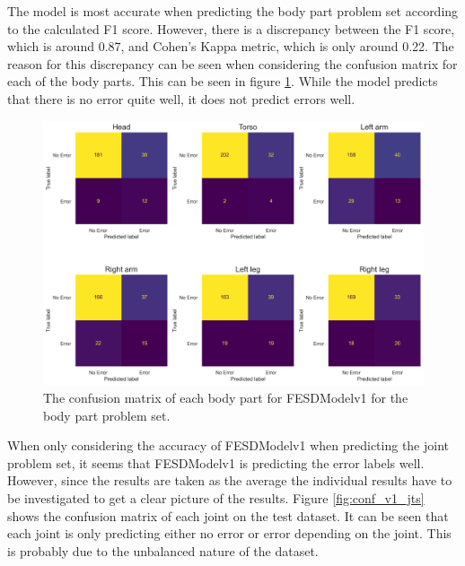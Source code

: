 The model is most accurate when predicting the body part problem set according to the calculated F1 score. However, there is a discrepancy between the F1 score, which is around 0.87, and Cohen's Kappa metric, which is only around 0.22. The reason for this discrepancy can be seen when considering the confusion matrix for each of the body parts. This can be seen in figure \ref{fig:conf_v1_bps}. While the model predicts that there is no error quite well, it does not predict errors well.

\begin{figure}[!htbp]
  \centering
  \includegraphics[width=.8\linewidth]{figures/Results/v1/confusion/body_parts_part.png}
  \caption[Confusion matrix of FESDModelv1 for each Body Part]{The confusion matrix of each body part for FESDModelv1 for the body part problem set.}
  \label{fig:conf_v1_bps}
\end{figure}

When only considering the accuracy of FESDModelv1 when predicting the joint problem set, it seems that FESDModelv1 is predicting the error labels well. However, since the results are taken as the average the individual results have to be investigated to get a clear picture of the results. Figure \ref{fig:conf_v1_jts} shows the confusion matrix of each joint on the test dataset. It can be seen that each joint is only predicting either no error or error depending on the joint. This is probably due to the unbalanced nature of the dataset.

